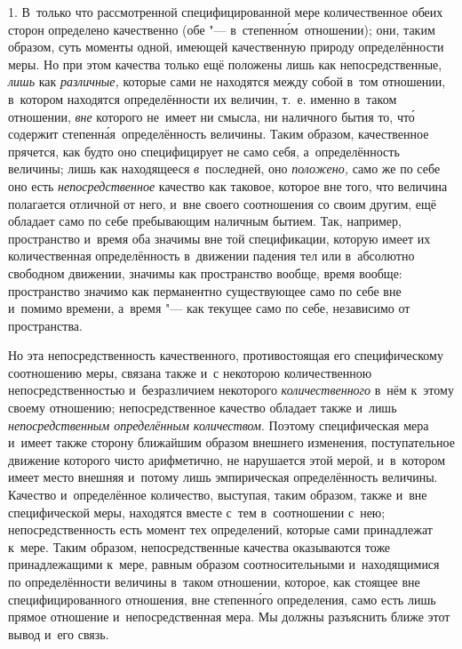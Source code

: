 
1. В~только что рассмотренной специфицированной мере количественное обеих
сторон определено качественно (обе "--- в~степенн\'{о}м~отношении); они, таким
образом, суть моменты одной, имеющей качественную природу определённости меры.
Но при этом качества только ещё положены лишь как непосредственные, {\em лишь}
как {\em различные,} которые сами не находятся между собой в~том отношении,
в~котором находятся определённости их величин, т.~е. именно в~таком отношении,
{\em вне} которого не~имеет ни смысла, ни наличного бытия то, чт\'{о} содержит
степенн\'{а}я~определённость величины. Таким образом, качественное прячется,
как будто оно специфицирует не само себя, а~определённость величины; лишь как
находящееся {\em в}~последней, оно {\em положено,} само же по себе оно есть
{\em непосредственное} качество как таковое, которое вне того, что величина
полагается отличной от него, и~вне своего соотношения со своим другим, ещё
обладает само по себе пребывающим наличным бытием. Так, например, пространство
и~время оба значимы вне той спецификации, которую имеет их количественная
определённость в~движении падения тел или в~абсолютно свободном движении,
значимы как пространство вообще, время вообще: пространство значимо как
перманентно существующее само по себе вне и~помимо времени, а~время "--- как
текущее само по себе, независимо от пространства.

Но эта непосредственность качественного, противостоящая его специфическому
соотношению меры, связана также и~с некоторою количественною
непосредственностью и~безразличием некоторого {\em количественного} в~нём
к~этому своему отношению; непосредственное качество обладает также и~лишь
{\em непосредственным определённым количеством}. Поэтому специфическая мера
и~имеет также сторону ближайшим образом внешнего изменения, поступательное
движение которого чисто арифметично, не нарушается этой мерой, и~в~котором
имеет место внешняя и~потому лишь эмпирическая определённость величины.
Качество и~определённое количество, выступая, таким образом, также и~вне
специфической меры, находятся вместе с~тем в~соотношении с~нею;
непосредственность есть момент тех определений, которые сами принадлежат
к~мере. Таким образом, непосредственные качества оказываются тоже
принадлежащими к~мере, равным образом соотносительными и~находящимися по
определённости величины в~таком отношении, которое, как стоящее вне
специфицированного отношения, вне степенн\'{о}го определения, само есть лишь
прямое отношение и~непосредственная мера. Мы должны разъяснить ближе этот
вывод и~его связь.

